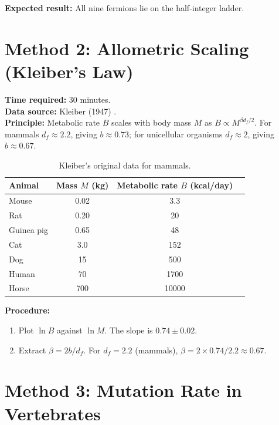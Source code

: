 \documentclass[12pt,a4paper]{article}
\begin{document}
	\textbf{Expected result:} All nine fermions lie on the half‑integer ladder.
	
	\section{Method 2: Allometric Scaling (Kleiber's Law)}
	\label{sec:kleiber}
	
	\textbf{Time required:} 30 minutes.\\
	\textbf{Data source:} Kleiber (1947) \cite{Kleiber1947}.\\
	\textbf{Principle:} Metabolic rate \(B\) scales with body mass \(M\) as
	\(B \propto M^{\beta d_f/2}\).  For mammals \(d_f \approx 2.2\), giving
	\(b \approx 0.73\); for unicellular organisms \(d_f \approx 2\), giving
	\(b \approx 0.67\).
	
	\begin{table}[H]
		\centering
		\caption{Kleiber's original data for mammals.}
		\label{tab:kleiber}
		\begin{tabular}{l c c c}
			\toprule
			Animal  & Mass \(M\) (kg) & Metabolic rate \(B\) (kcal/day) \\
			\midrule
			Mouse       & 0.02   & 3.3 \\
			Rat         & 0.20   & 20 \\
			Guinea pig  & 0.65   & 48 \\
			Cat         & 3.0    & 152 \\
			Dog         & 15     & 500 \\
			Human       & 70     & 1700 \\
			Horse       & 700    & 10000 \\
			\bottomrule
		\end{tabular}
	\end{table}
	
	\textbf{Procedure:}
	\begin{enumerate}[label=(\arabic*)]
		\item Plot \(\ln B\) against \(\ln M\).  The slope is \(0.74 \pm 0.02\).
		\item Extract \(\beta = 2b / d_f\).  For \(d_f = 2.2\) (mammals),
		\(\beta = 2 \times 0.74 / 2.2 \approx 0.67\).
	\end{enumerate}
	
	\section{Method 3: Mutation Rate in Vertebrates}
	\label{sec:mutation}
	
\end{document}
